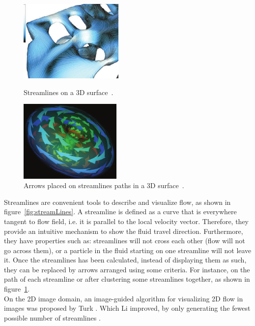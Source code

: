 \documentclass[11pt]{report}
\begin{document}
\begin{figure}
	\centering
	\begin{minipage}[t]{.45\textwidth}
		\centering
		\includegraphics[width=.8\textwidth,height=4cm]{images/streamLinesSpencer}
		\caption{Streamlines on a 3D surface~\cite{Spencer2009}.}
		\label{fig:streamLines}
	\end{minipage}\hfill
	\begin{minipage}[t]{.45\textwidth}
		\centering
		\includegraphics[width=.8\textwidth,height=4cm]{images/streamArrows}
		\caption{Arrows placed on streamlines paths in a 3D surface~\cite{loffelmann1998}.}
		\label{fig:streamArrows}
	\end{minipage}
\end{figure}

Streamlines are convenient tools to describe and visualize flow, as shown in figure~\ref{fig:streamLines}.
A streamline is defined as a curve that is everywhere tangent to flow field, i.e. it is parallel to the local velocity vector.
Therefore, they provide an intuitive mechanism to show the fluid travel direction.
Furthermore, they have properties such as: streamlines will not cross each other (flow will not go across them), or a particle in the fluid starting on one streamline will not leave it.
Once the streamlines has been calculated, instead of displaying them as such, they can be replaced by arrows arranged using some criteria.
For instance, on the path of each streamline or after clustering some streamlines together, as shown in figure~\ref{fig:streamArrows}.\\

On the 2D image domain, an image-guided algorithm for visualizing 2D flow in images was proposed by Turk \cite{Turk1996}.
Which Li improved, by only generating the fewest possible number of streamlines \cite{Li2008}. \\
\end{document}
